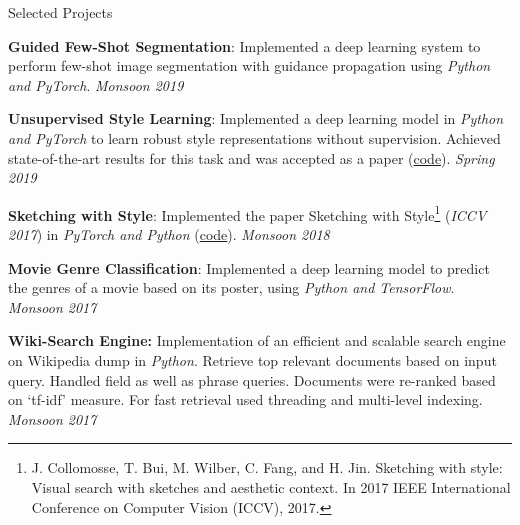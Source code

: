 \documentclass{resume} %
\begin{document}
\begin{rSection}{Selected Projects} \itemsep -4pt



\item \textbf{Guided Few-Shot Segmentation}: Implemented a deep learning system to perform few-shot image segmentation with guidance propagation using \textit{Python and PyTorch}. \textit{Monsoon 2019}

\item \textbf{Unsupervised Style Learning}: Implemented a deep learning model in \textit{Python and PyTorch} to learn robust style representations without supervision. Achieved state-of-the-art results for this task and was accepted as a paper (\href{https://github.com/sidgairo18/unsupervised-style-learning}{code}). \textit{Spring 2019}

\item \textbf{Sketching with Style}: Implemented the paper Sketching with Style\footnote{J.  Collomosse,  T.  Bui,  M.  Wilber,  C.  Fang,  and  H.  Jin. Sketching with style:  Visual search with sketches and aesthetic context. In 2017 IEEE International Conference on Computer Vision (ICCV), 2017.} (\textit{ICCV 2017}) in \textit{PyTorch and Python} (\href{https://github.com/sidgairo18/Sketching-with-Style-ICCV-2017-PyTorch-}{code}).  \textit{Monsoon 2018}

\item \textbf{Movie Genre Classification}: Implemented a deep learning model to predict the genres of a movie based on its poster, using \textit{Python and TensorFlow}. \textit{Monsoon 2017}

\item \textbf{Wiki-Search Engine:} Implementation of an efficient and scalable search engine on Wikipedia dump in \textit{Python}. Retrieve top relevant documents based on input query. Handled field as well as phrase queries. Documents were re-ranked based on `tf-idf' measure. For fast retrieval used threading and multi-level indexing.
\textit{Monsoon 2017}


\end{rSection}
\end{document}
